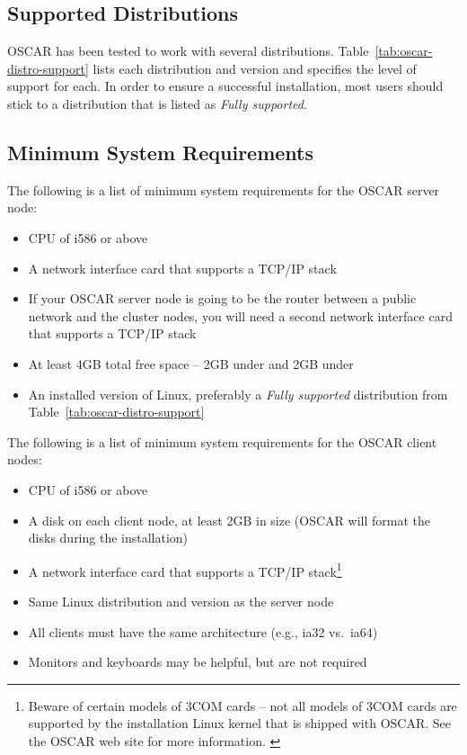 \subsection{Supported Distributions}

OSCAR has been tested to work with several distributions.
Table~\ref{tab:oscar-distro-support} lists each distribution and
version and specifies the level of support for each. In order to
ensure a successful installation, most users should stick to a
distribution that is listed as \emph{Fully supported}.




\subsection{Minimum System Requirements}
\label{sec:intro-min-sys}

\begchange

The following is a list of minimum system requirements for the OSCAR
server node:

\begin{itemize}
\item CPU of i586 or above
\item A network interface card that supports a TCP/IP stack
\item If your OSCAR server node is going to be the router between a
  public network and the cluster nodes, you will need a second
  network interface card that supports a TCP/IP stack
\item At least 4GB total free space -- 2GB under \file{/} and 2GB
  under 
\item An installed version of Linux, preferably a {\em Fully
    supported} distribution from Table~\ref{tab:oscar-distro-support}
\end{itemize}

The following is a list of minimum system requirements for the OSCAR
client nodes:

\begin{itemize}
\item CPU of i586 or above
\item A disk on each client node, at least 2GB in size (OSCAR will
  format the disks during the installation)
\item A network interface card that supports a TCP/IP
  stack\footnote{Beware of certain models of 3COM cards -- not all
    models of 3COM cards are supported by the installation Linux
    kernel that is shipped with OSCAR.  See the OSCAR web site for
    more information. \label{foot:3com-warning}}
\item Same Linux distribution and version as the server node
\item All clients must have the same architecture (e.g., ia32 vs.\ 
  ia64)
\item Monitors and keyboards may be helpful, but are not required
\end{itemize}

